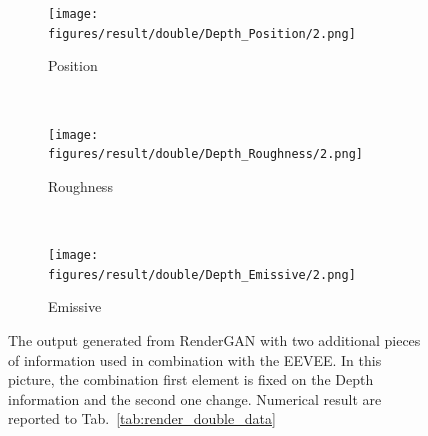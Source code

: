 \begin{figure}[h!]
    \begin{subfigure}[b]{0.175\textwidth}
     \texttt{[image: figures/result/double/Depth\_Position/2.png]}
     \caption{Position}
    \end{subfigure}
    ~
    \begin{subfigure}[b]{0.175\textwidth}
     \texttt{[image: figures/result/double/Depth\_Roughness/2.png]}
     \caption{Roughness}
    \end{subfigure}
    ~
    \begin{subfigure}[b]{0.175\textwidth}
     \texttt{[image: figures/result/double/Depth\_Emissive/2.png]}
     \caption{Emissive}
     \label{subfig:double_input_base_depth_and_emissive2}
    \end{subfigure}
    \caption[Generation Result with fixed input on Depth]{The output generated from RenderGAN with two additional pieces of information used in combination with the EEVEE. In this picture, the combination first element is fixed on the Depth information and the second one change. Numerical result are reported to Tab.~\ref{tab:render_double_data}}
    \label{fig:double_input_base_depth_generation}
\end{figure}

